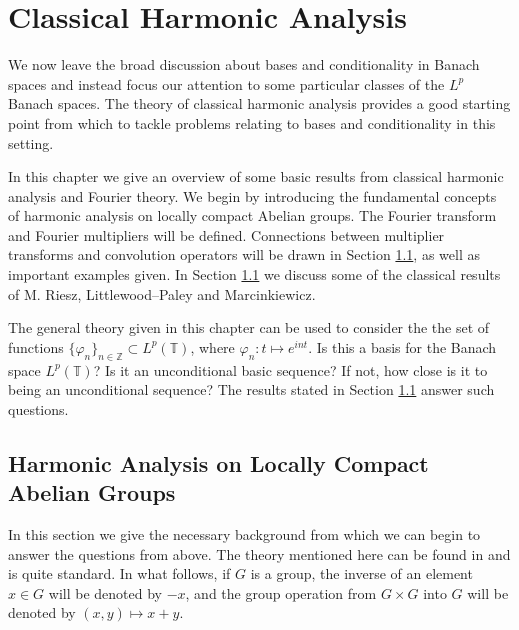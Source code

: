 \documentclass[mmath,12pt]{unswthesis}   %
\newcommand{\T}{\mathbb{T}}
\newcommand{\Z}{\mathbb{Z}}
\numberwithin{equation}{section}
\begin{document}

\chapter{Classical Harmonic Analysis}\label{cha}





We now
leave the broad discussion about bases and conditionality in Banach spaces and
instead focus our attention to some particular classes of the $L^p$ Banach
spaces. The theory of classical harmonic analysis provides a good starting point
from which to tackle problems relating to bases and conditionality in this 
setting.

In this chapter we give an overview of some basic results from classical
harmonic analysis and Fourier theory.
We begin by introducing the fundamental concepts of harmonic analysis on locally
compact Abelian groups. The Fourier transform and Fourier multipliers will be
defined. Connections between multiplier transforms and convolution operators 
will
be drawn in Section \ref{lca}, as well as important examples given. In
Section \ref{lca} we discuss some of the classical results of M. Riesz,
Littlewood--Paley and Marcinkiewicz.

The general theory given in this chapter can be used to consider the
the set of functions $\{\varphi_n\}_{n\in\Z}\subset L^p(\T)$, where
$\varphi_n:t\mapsto e^{int}$. Is this a basis for the Banach space $L^p(\T)$?
Is it an unconditional basic sequence? If not, how close is it
to being an unconditional sequence? The results stated in Section 
\ref{lca}
answer such questions.




\section{Harmonic Analysis on Locally Compact Abelian Groups}\label{lca}


In this section we give the necessary background from which we can begin to
answer
the questions from
above. The theory mentioned here can be found in \cite{Katznelson}
and is quite 
standard. In what follows, if $G$ is a group, the inverse of an
element $x\in G$ will be denoted by $-x$, and the group operation from
$G\times G$ into $G$ will be denoted by $(x,y)\mapsto x+y$. 
\end{document}
